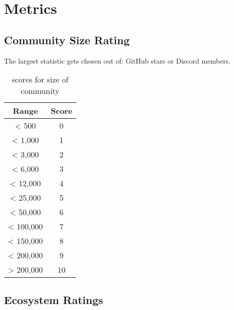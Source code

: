 \chapter{Metrics}

\section{Community Size Rating}

\normalsize
The largest statistic gets chosen out of: GitHub stars or Discord members.

\begin{table}[H]
    \centering
    \begin{tabular}{|c|c|}
        \hline
        \textbf{Range} & \textbf{Score} \\
        \hline
        < 500          & 0              \\ \hline
        < 1,000        & 1              \\ \hline
        < 3,000        & 2              \\ \hline
        < 6,000        & 3              \\ \hline
        < 12,000       & 4              \\ \hline
        < 25,000       & 5              \\ \hline
        < 50,000       & 6              \\ \hline
        < 100,000      & 7              \\ \hline
        < 150,000      & 8              \\ \hline
        < 200,000      & 9              \\ \hline
        > 200,000      & 10             \\ \hline
    \end{tabular}
    \caption{scores for size of community}
    \label{tab:metrics:community}
\end{table}

\section{Ecosystem Ratings}

